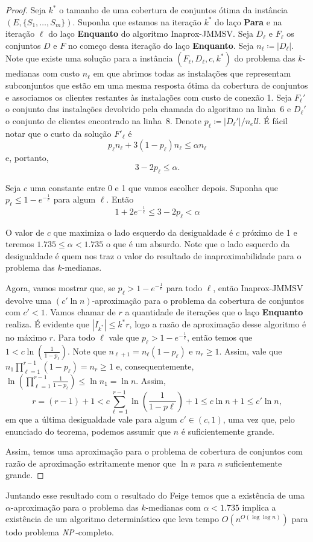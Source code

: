\begin{proof}
Seja $k^*$ o tamanho de uma cobertura de conjuntos ótima da instância $(E,\{S_1,\ldots,S_m\})$. Suponha que estamos na iteração $k^*$ do laço {\bf Para} e na iteração $\ell$ do laço {\bf Enquanto} do algoritmo {\sc Inaprox-JMMSV}.
Seja $D_\ell$ e $F_\ell$ os conjuntos $D$ e $F$ no começo dessa iteração do laço {\bf Enquanto}. Seja $n_\ell \coloneqq |D_\ell|$. Note que existe uma solução para a instância $(F_\ell,D_\ell,c,k^*)$ do problema das $k$-medianas com custo $n_\ell$ em que abrimos todas as instalações que representam subconjuntos que estão em uma mesma resposta ótima da cobertura de conjuntos e associamos os clientes restantes às instalações com custo de conexão 1.
Seja $F_\ell'$ o conjunto das instalações devolvido pela chamada do algoritmo na linha~6 e $D_\ell'$ o conjunto de clientes encontrado na linha~8. Denote $p_\ell \coloneqq  |D_\ell'|/n_ell$. É fácil notar que o custo da solução $F'_\ell$ é
\[ p_\ell n_\ell + 3 (1-p_\ell) n_\ell \leq \alpha  n_\ell\]
e, portanto, 
\begin{equation} 
3 - 2p_\ell \leq \alpha.
\end{equation}

Seja $c$ uma constante entre 0 e 1 que vamos escolher depois. Suponha que ${p_\ell \leq 1 - e^{-\frac{1}{c}}}$ para algum $\ell$. 
Então
\[ 1 + 2e^{-\frac{1}{c}} \leq 3 - 2p_\ell < \alpha\]

O valor de $c$ que maximiza o lado esquerdo da desigualdade é $c$ próximo de 1 e teremos $1.735 \leq \alpha < 1.735$ o que é um absurdo. Note que o lado esquerdo da desigualdade é quem nos traz o valor do resultado de inaproximabilidade para o problema das $k$-medianas.

Agora, vamos mostrar que, se $p_\ell > 1 - e^{ - \frac{1}{c}}$ para todo $\ell$, então {\sc Inaprox-JMMSV} devolve uma $(c'\ln n)$-aproximação para o problema da cobertura de conjuntos com $c' < 1$. Vamos chamar de $r$ a quantidade de iterações que o laço {\bf Enquanto} realiza. É evidente que $|I_{k^*}| \leq k^*r$, logo a razão de aproximação desse algoritmo é no máximo $r$. Para todo $\ell$ vale que $p_\ell > 1 - e^{ - \frac{1}{c}}$, então temos que $1 < c \ln\left( \frac{1}{1-p_\ell}\right)$. Note que $n_{\ell + 1} = n_\ell(1-p_\ell)$ e $n_r \geq 1$. Assim, vale que $n_1 \prod_{\ell =1}^{r-1} (1 - p_\ell) = n_r \geq 1$ e, consequentemente, $\ln\left(\prod_{\ell =1 }^{r-1} \frac{1}{1-p_\ell}\right) \leq \ln n_1 = \ln n$. Assim,
\[ r = (r - 1) + 1 < c\sum_{\ell = 1}^{r-1} \ln \left( \frac{1}{1-p\ell}\right) + 1 \leq c \ln n + 1 \leq c' \ln n, \]
em que a última desigualdade vale para algum $c' \in (c,1)$, uma vez que, pelo enunciado do teorema, podemos assumir que $n$ é suficientemente grande.

Assim, temos uma aproximação para o problema de cobertura de conjuntos com razão de aproximação estritamente menor que $\ln n$ para $n$ suficientemente grande.
\end{proof}

Juntando esse resultado com o resultado do Feige temos que a existência de uma $\alpha$-aproximação para o problema das $k$-medianas com $\alpha < 1.735$ implica a existência de um algoritmo determinístico que leva tempo $O(n^{O(\log \log n)})$ para todo problema $\mathit{NP}$-completo.